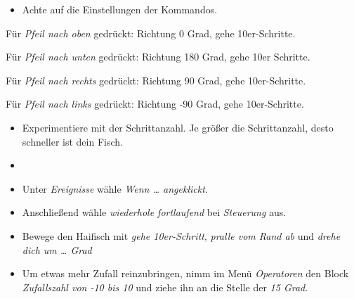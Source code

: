 \documentclass{article}
\begin{document}
\begin{itemize}[left=0pt]
    \item Achte auf die Einstellungen der Kommandos.
\end{itemize}

Für \textit{Pfeil nach oben} gedrückt: Richtung 0 Grad, gehe 10er-Schritte. 

Für \textit{Pfeil nach unten} gedrückt: Richtung 180 Grad, gehe 10er Schritte.
    
Für \textit{Pfeil nach rechts} gedrückt: Richtung 90 Grad, gehe 10er-Schritte.
    
Für \textit{Pfeil nach links} gedrückt: Richtung -90 Grad, gehe 10er-Schritte.       


\begin{itemize}[left=0pt]
        \item Experimentiere mit der Schrittanzahl. Je größer die Schrittanzahl, desto schneller ist dein Fisch.
        \item {}
\end{itemize}


\begin{itemize}[left=0pt]
    \item Unter \textit{Ereignisse} wähle \textit{Wenn … angeklickt}.
    \item Anschließend wähle \textit{wiederhole fortlaufend} bei \textit{Steuerung} aus.
    \item Bewege den Haifisch mit \textit{gehe 10er-Schritt}, \textit{pralle vom Rand ab} und \textit{drehe dich um … Grad}
    \item Um etwas mehr Zufall reinzubringen, nimm im Menü \textit{Operatoren} den Block \textit{Zufallszahl von -10 bis 10} und ziehe ihn an die Stelle der \textit{15 Grad}.
\end{itemize}
\end{document}
